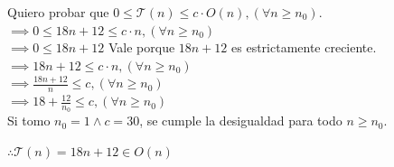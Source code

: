 \documentclass[12 pt]{article}
\begin{document}
\begin{itemize}
            Quiero probar que \(0 \leq \mathcal{T}(n) \leq c \cdot O(n), (\forall n \geq n_{0})\). \\
            \(\implies 0 \leq 18n+12 \leq c \cdot n, (\forall n \geq n_{0})\) \\
            \(\implies 0 \leq 18n+12\) Vale porque $18n+12$ es estrictamente creciente. \\
            \(\implies 18n+12 \leq c \cdot n, (\forall n \geq n_{0})\) \\
            \(\implies \frac{18n+12}{n} \leq c, (\forall n \geq n_{0})\) \\
            \(\implies 18+\frac{12}{n_{0}} \leq c, (\forall n \geq n_{0})\) \\
            Si tomo \(n_{0} = 1 \wedge c = 30\), se cumple la desigualdad para todo $n \geq n_{0}$.
            \begin{center}
                \(\therefore \mathcal{T}(n) = 18n+12 \in O(n)\)
            \end{center}
    \end{itemize}

\newpage
\end{document}
